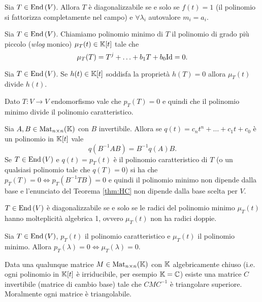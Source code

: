 \begin{thm}
	Sia $ T \in \operatorname{End}{(V)} $. Allora $ T $ è diagonalizzabile se e solo se $ f(t) = 1 $ (il polinomio si fattorizza completamente nel campo) e $ \forall \lambda_i $ autovalore $ m_i = a_i $. 
\end{thm}

\begin{definition}
	Sia $ T \in \operatorname{End}{(V)} $. Chiamiamo polinomio minimo di $ T $ il polinomio di grado più piccolo (\emph{wlog} monico) $ \mu_T(t) \in \mathbb{K}[t] $ tale che \[\mu_T(T) = T^j + \ldots + b_1 T + b_0 \mathrm{Id} = 0.\] 
\end{definition}

\begin{thm}
	Sia $ T \in \operatorname{End}{(V)} $. Se $ h(t) \in \mathbb{K}[t] $ soddisfa la proprietà $ h(T) = 0 $ allora $ \mu_T(t) $ divide $ h(t) $. 
\end{thm}

\begin{thm} \label{thm:HC}
	Dato $ T \colon V \to V $ endomorfismo vale che $ p_T(T) = 0 $ e quindi che il polinomio minimo divide il polinomio caratteristico. 
\end{thm}

\begin{prop}
	Sia $ A, B \in \mathrm{Mat}_{n \times n} (\mathbb{K}) $ con $ B $ invertibile. Allora se $ q(t) = c_n t^{n} + \ldots + c_1 t + c_0 $ è un polinomio in $ \mathbb{K}[t] $ vale \[q(B^{-1} A B) = B^{-1} q(A) B. \] Se $ T \in \operatorname{End}{(V)} $ e $ q(t) = p_T(t) $ è il polinomio caratteristico di $ T $ (o un qualsiasi polinomio tale che $ q(T) = 0 $) si ha che $ p_T(T) = 0 \iff p_T(B^{-1} T B) = 0 $ e quindi il polinomio minimo non dipende dalla base e l'enunciato del Teorema \ref{thm:HC} non dipende dalla base scelta per $ V $. 
\end{prop}

\begin{prop}
	$ T \in \operatorname{End}{(V)} $ è diagonalizzabile se e solo se le radici del polinomio minimo $ \mu_T(t) $ hanno molteplicità algebrica 1, ovvero $ \mu_T(t) $ non ha radici doppie. 
\end{prop}

\begin{prop}
	Sia $ T \in \operatorname{End}{(V)} $, $ p_T(t) $ il polinomio caratteristico e $ \mu_T(t) $ il polinomio minimo. Allora $ p_T(\lambda) = 0 \iff \mu_T(\lambda) = 0 $. 
\end{prop}

\begin{thm}[triangolazione]
	Data una qualunque matrice $ M \in \mathrm{Mat}_{n \times n} (\mathbb{K}) $ con $ \mathbb{K} $ algebricamente chiuso (i.e. ogni polinomio in $ \mathbb{K}[t] $ è irriducibile, per esempio $ \mathbb{K} = \mathbb{C} $) esiste una matrice $ C $ invertibile (matrice di cambio base) tale che $ CMC^{-1} $ è triangolare superiore. \\ Moralmente ogni matrice è triangolabile. 
\end{thm}

